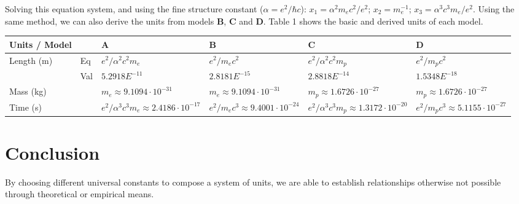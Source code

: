 \documentclass[11pt]{article}
\begin{document}
\noindent Solving this equation system, and using the fine structure constant ($\alpha = e^2 / \hbar c$): $x_1 = \alpha^2 m_e c^2 / e^2$; $x_2 = m^{-1}_e$; $x_3 = \alpha^3 c ^3 m_e / e^2$. Using the same method, we can also derive the units from models $\mathbf{B}$, $\mathbf{C}$ and $\mathbf{D}$. Table 1 shows the basic and derived units of each model. 

\vspace{1cm}
\noindent\begin{tabularx}{\textwidth}{ l l | X X X X }
    \hline
    Units / Model & & $\mathbf{A}$ & $\mathbf{B}$ & $\mathbf{C}$ & $\mathbf{D}$ \\
    \hline \hline
    Length (m) & Eq & $e^2 / \alpha^2 c^2 m_e $ & $ e^2 / m_e c^2 $ & $ e^2 / \alpha^2 c^2 m_p $ & $ e^2 / m_p c^2 $ \\
    & Val & $5.2918E^{-11}$ & $2.8181E^{-15} $ & $2.8818E^{-14} $ & $1.5348E^{-18} $ \\
    Mass (kg) & & $ m_e \approx 9.1094 \cdot 10^{-31} $ & $ m_e \approx 9.1094 \cdot 10^{-31} $ & $ m_p \approx 1.6726 \cdot 10^{-27} $ & $ m_p\approx 1.6726 \cdot 10^{-27} $  \\
    Time (s) & & $ e^2/\alpha^3 c^3 m_e \approx 2.4186 \cdot 10^{-17} $ & $ e^2/m_ec^3 \approx 9.4001 \cdot 10^{-24} $ & $ e^2/\alpha^3 c^3 m_p \approx 1.3172 \cdot 10^{-20} $ & $ e^2 / m_p c^3 \approx 5.1155 \cdot 10^{-27}$  \\
    \hline

\end{tabularx}




\section{Conclusion}
By choosing different universal constants to compose a system of units, we are able to establish relationships otherwise not possible through theoretical or empirical means. 
\end{document}
